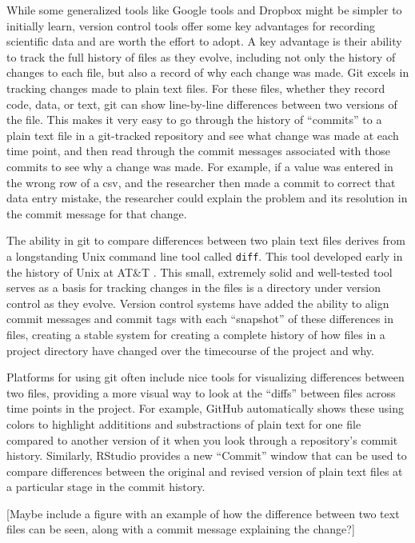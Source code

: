 \documentclass[]{tufte-book}
\begin{document}
While some generalized tools like Google tools and Dropbox might be simpler to
initially learn, version control tools offer some key advantages for recording
scientific data and are worth the effort to adopt. A key advantage is their
ability to track the full history of files as they evolve, including not only
the history of changes to each file, but also a record of why each change was
made. Git excels in tracking changes made to plain text
files. For these files, whether they record code, data, or text, git can show
line-by-line differences between two versions of the file. This makes it very
easy to go through the history of ``commits'' to a plain text file in a
git-tracked repository and see what change was made at each time point, and then
read through the commit messages associated with those commits to see why a
change was made. For example, if a value was entered in the wrong row of a csv,
and the researcher then made a commit to correct that data entry mistake, the
researcher could explain the problem and its resolution in the commit message
for that change.

The ability in git to compare differences between two plain text files derives from
a longstanding Unix command line tool called \texttt{diff}. This tool developed early in
the history of Unix at AT\&T \citep{raymond2003art}. This small, extremely solid and
well-tested tool serves as a basis for tracking changes in the files is a directory
under version control as they evolve. Version control systems have added the
ability to align commit messages and commit tags with each ``snapshot'' of these
differences in files, creating a stable system for creating a complete history of
how files in a project directory have changed over the timecourse of the project and
why.

Platforms for using git often include nice tools for visualizing differences
between two files, providing a more visual way to look at the ``diffs'' between
files across time points in the project. For example, GitHub automatically shows
these using colors to highlight addititions and substractions of plain text for
one file compared to another version of it when you look through a repository's
commit history. Similarly, RStudio provides a new ``Commit'' window that can be
used to compare differences between the original and revised version of plain
text files at a particular stage in the commit history.

{[}Maybe include a figure with an example of how the difference between two
text files can be seen, along with a commit message explaining the change?{]}
\end{document}
